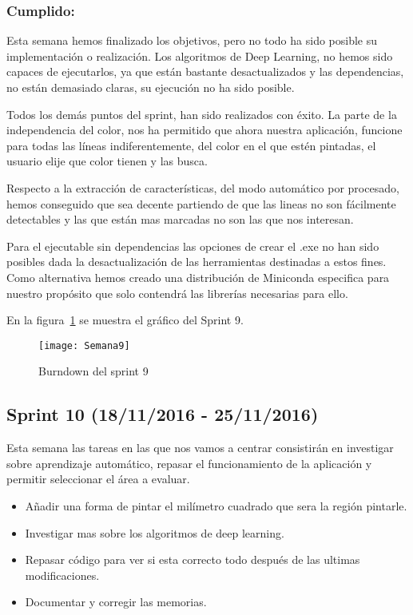 \subsubsection{Cumplido:}
Esta semana hemos finalizado los objetivos, pero no todo ha sido posible su implementación o realización.
Los algoritmos de Deep Learning, no hemos sido capaces de ejecutarlos, ya que están bastante desactualizados y las dependencias, no están demasiado claras, su ejecución no ha sido posible.

Todos los demás puntos del sprint, han sido realizados con éxito.
La parte de la independencia del color, nos ha permitido que ahora nuestra aplicación, funcione para todas las líneas indiferentemente, del color en el que estén pintadas, el usuario elije que color tienen y las busca.

Respecto a la extracción de características, del modo automático por procesado, hemos conseguido que sea decente partiendo de que las lineas no son fácilmente detectables y las que están mas marcadas no son las que nos interesan.

Para el ejecutable sin dependencias las opciones de crear el .exe no han sido posibles dada la desactualización de las herramientas destinadas a estos fines.
Como alternativa hemos creado una distribución de Miniconda especifica para nuestro propósito que solo contendrá las librerías necesarias para ello.

En la figura~\ref{fig:A.2.9} se muestra el gráfico del Sprint 9.

\begin{figure}[h]
\centering
\texttt{[image: Semana9]}
\caption{Burndown del sprint 9}
\label{fig:A.2.9}
\end{figure}


\subsection{Sprint 10 (18/11/2016 - 25/11/2016)}
Esta semana las tareas en las que nos vamos a centrar consistirán en investigar sobre aprendizaje automático, repasar el funcionamiento de la aplicación y permitir seleccionar el área a evaluar.

\begin{itemize}
	\item Añadir una forma de pintar el milímetro cuadrado que sera la región pintarle.
	\item Investigar mas sobre los algoritmos de deep learning.
	\item Repasar código para ver si esta correcto todo después de las ultimas modificaciones.
	\item Documentar y corregir las memorias.
\end{itemize}

